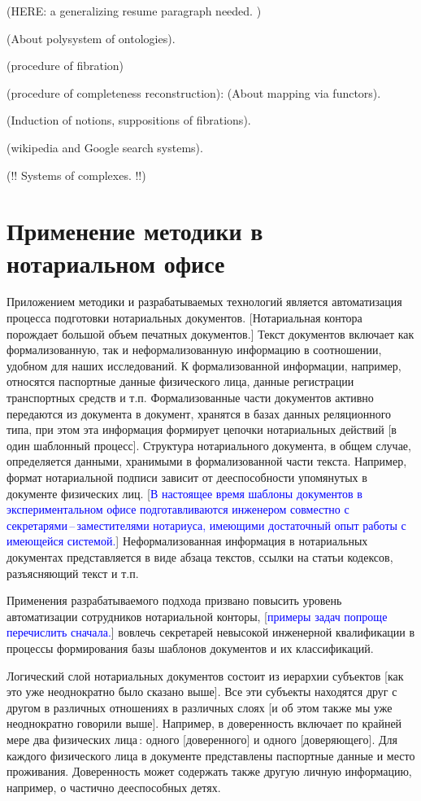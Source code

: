 \documentclass[utf8]{../IncArticle}
\newcommand{\e}[2][fcolor]{\textcolor{pcolor}{[}\textcolor{#1}{#2}\textcolor{pcolor}{]}}
\begin{document}
(HERE: a generalizing resume paragraph needed.  )

(About polysystem of ontologies).

(procedure of fibration)

(procedure of completeness reconstruction): (About mapping via functors).

(Induction of notions, suppositions of fibrations).

(wikipedia and Google search systems).

(!! Systems of complexes. !!)

\section{Применение методики в нотариальном офисе}

Приложением методики и разрабатываемых технологий является
автоматизация процесса подготовки нотариальных документов.
\e{Нотариальная контора порождает большой объем печатных документов.}
Текст документов включает как формализованную, так и неформализованную
информацию в соотношении, удобном для наших исследований.  К
формализованной информации, например, относятся паспортные данные
физического лица, данные регистрации транспортных средств и т.п.
Формализованные части документов активно передаются из документа в
документ, хранятся в базах данных реляционного типа, при этом эта
информация формирует цепочки нотариальных действий \e{в один шаблонный
процесс}.  Структура нотариального документа, в общем случае,
определяется данными, хранимыми в формализованной части текста.
Например, формат нотариальной подписи зависит от дееспособности
упомянутых в документе физических лиц.  \e[blue]{В настоящее время шаблоны
документов в экспериментальном офисе подготавливаются инженером
совместно с секретарями\,--\,заместителями нотариуса, имеющими
достаточный опыт работы с имеющейся системой.} Неформализованная
информация в нотариальных документах представляется в виде абзаца
текстов, ссылки на статьи кодексов, разъясняющий текст и т.п.

Применения разрабатываемого подхода призвано повысить уровень
автоматизации сотрудников нотариальной конторы, \e[blue]{примеры
  задач попроще перечислить сначала.} вовлечь секретарей
невысокой инженерной квалификации в процессы формирования базы шаблонов
документов и их классификаций.

Логический слой нотариальных документов состоит из иерархии субъектов
\e{как это уже неоднократно было сказано выше}.  Все эти субъекты
находятся друг с другом в различных отношениях в различных слоях
\e{и об этом также мы уже неоднократно говорили выше}.  Например, в
доверенность включает по крайней мере два физических лица\,: одного
\e{доверенного} и одного \e{доверяющего}.  Для каждого физического
лица в документе представлены паспортные данные и место проживания.
Доверенность может содержать также другую личную информацию, например,
о частично дееспособных детях.
\end{document}
